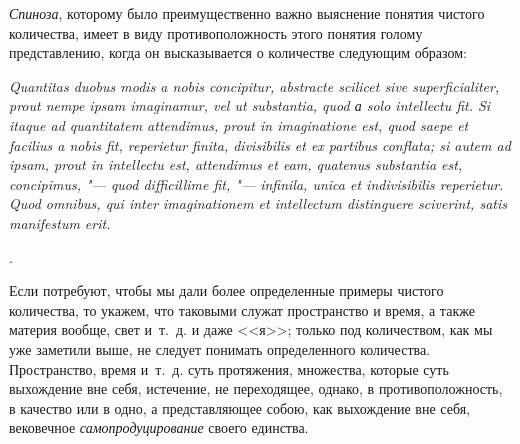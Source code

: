 {\em Спиноза}, которому было преимущественно важно выяснение понятия чистого
количества, имеет в виду противоположность этого понятия голому представлению,
когда он высказывается о количестве следующим образом:

\vspace{3mm}

\begin{footnotesize}\fontsize{10}{10}\selectfont
\em Quantitas duobus modis a nobis conci\-pitur, abs\-trac\-te scili\-cet sive
super\-fi\-ci\-ali\-ter, prout nempe ipsam ima\-gina\-mur, vel ut
sub\-stan\-tia, quod а solo intel\-lectu fit. Si itaque ad quanti\-tatem
atten\-di\-mus, prout in imagin\-ati\-one est, quod saepe et faci\-lius a nobis
fit, repe\-rietur finita, divi\-sibi\-lis et ex parti\-bus con\-flata; si autem
ad ipsam, prout in intel\-lectu est, atten\-di\-mus et eam, quate\-nus
sub\-stan\-tia est, con\-cipi\-mus, "--- quod dif\-ficil\-lime fit, "---
infi\-nila, unica et indi\-vi\-si\-bi\-lis re\-perietur. Quod omni\-bus, qui
inter ima\-gi\-na\-tio\-nem et intel\-lectum dis\-tin\-guere scive\-rint, satis
mani\-fes\-tum erit.\par
\end{footnotesize}

\vspace{3mm}

.

Если потребуют, чтобы мы дали более определенные примеры чистого количества,
то укажем, что таковыми служат пространство и время, а также материя
вообще, свет и~т.~д. и даже <<я>>; только под количеством, как мы уже
заметили выше, не следует понимать определенного количества. Пространство,
время и~т.~д. суть протяжения, множества, которые суть выхождение вне себя,
истечение, не переходящее, однако, в противоположность, в качество или в
одно, а представляющее собою, как выхождение вне себя, вековечное
{\em самопродуцирование} своего единства.

